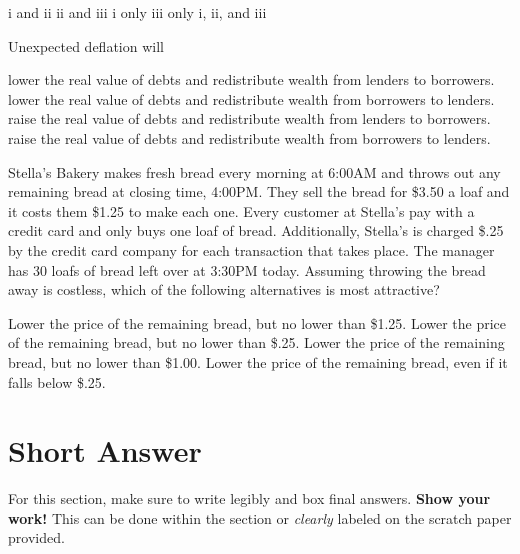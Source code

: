 \documentclass[addpoints,11pt]{exam}
\theoremstyle{definition}
\begin{document}
\begin{questions}
	\begin{choices}
		\choice i and ii
		\choice ii and iii
		\choice i only
		\CorrectChoice iii only
		\choice i, ii, and iii
	\end{choices}
	

	
	\question Unexpected deflation will
	
	\begin{choices}
		\choice lower the real value of debts and redistribute wealth from lenders to borrowers.
		\choice lower the real value of debts and redistribute wealth from borrowers to lenders.
		\choice raise the real value of debts and redistribute wealth from lenders to borrowers.
		\CorrectChoice raise the real value of debts and redistribute wealth from borrowers to lenders.
	\end{choices}
	

	
	\item Stella's Bakery makes fresh bread every morning at 6:00AM and throws out any remaining bread at closing time, 4:00PM. They sell the bread for \$3.50 a loaf and it costs them \$1.25 to make each one. Every customer at Stella's pay with a credit card and only buys one loaf of bread. Additionally, Stella's is charged \$.25 by the credit card company for each transaction that takes place. The manager has 30 loafs of bread left over at 3:30PM today. Assuming throwing the bread away is costless, which of the following alternatives is most attractive?
	
	\begin{choices}
		\choice Lower the price of the remaining bread, but no lower than \$1.25.
		\CorrectChoice Lower the price of the remaining bread, but no lower than \$.25.
		\choice Lower the price of the remaining bread, but no lower than \$1.00.
		\choice Lower the price of the remaining bread, even if it falls below \$.25.
	\end{choices}


\end{questions}

\newpage

\section*{Short Answer}

For this section, make sure to write legibly and box final answers. \textbf{Show your work!} This can be done within the section or \textit{clearly} labeled on the scratch paper provided.
\end{document}

